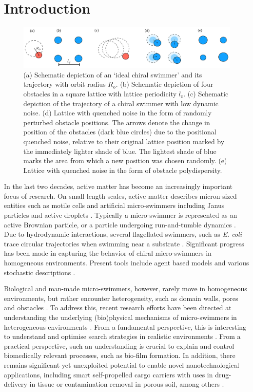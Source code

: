 \documentclass[aps,pre,twocolumn,showpacs,superscriptaddress,amsmath,amssymb,longbibliography]{revtex4-2}
\begin{document}
\section{Introduction}
\begin{figure}[ht!]
     \centering
     \includegraphics[width=17.1 cm]{fig_1.png}
        \caption{(a) Schematic depiction of an `ideal chiral swimmer' and its trajectory with orbit radius $R_{\textrm{o}}$. (b) Schematic depiction of four obstacles in a square lattice with lattice periodicity $l_{\textrm{c}}$. (c) Schematic depiction of the trajectory of a chiral swimmer with low dynamic noise. (d) Lattice with quenched noise in the form of randomly perturbed obstacle positions. The arrows denote the change in position of the obstacles (dark blue circles) due to the positional quenched noise, relative to their original lattice position marked by the immediately lighter shade of blue. The lightest shade of blue marks the area from which a new position was chosen randomly. (e) Lattice with quenched noise in the form of obstacle polydispersity.}
        \label{fig_1}
\end{figure}
In the last two decades, active matter has become an increasingly important focus of research. On small length scales, active matter describes micron-sized entities such as motile cells and artificial micro-swimmers including Janus particles and active droplets \cite{rev}. Typically a micro-swimmer is represented as an active Brownian particle, or a particle undergoing run-and-tumble dynamics \cite{activematter}. Due to hydrodynamic interactions, several flagellated swimmers, such as \textit{E. coli} trace circular trajectories when swimming near a substrate \cite{whychiral, whychiral2, whychiral3}. Significant progress has been made in capturing the behavior of chiral micro-swimmers in homogeneous environments. Present tools include agent based models and various stochastic descriptions \cite {msd3, msd4, msd6, msd5}.

Biological and man-made micro-swimmers, however, rarely move in homogeneous environments, but rather encounter heterogeneity, such as domain walls, pores and obstacles \cite{rev}. 
To address this, recent research efforts have been directed at understanding the underlying (bio)physical mechanisms of micro-swimmers in heterogeneous environments \cite{steering}. From a fundamental perspective, this is interesting to understand and optimise search strategies in realistic environments \cite{search}. From a practical perspective, such an understanding is crucial to explain and control biomedically relevant processes, such as bio-film formation. In addition, there remains signiﬁcant yet unexploited potential to enable novel nanotechnological applications, including smart self-propelled cargo carriers with uses in drug-delivery in tissue or contamination removal in porous soil, among others \cite{application1, application2, application3, application4, environment1}.  
\end{document}
